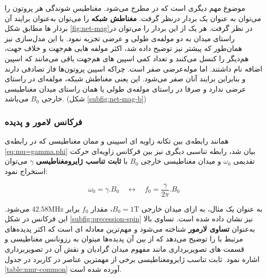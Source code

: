 موضوع مهم دیگری است که در \mri مطرح می‌شود.
مغناطیس شوندگی هر پروتون را می‌توان به عنوان یک بردار در‌نظر گرفت. \textbf{مغناطش شبکه} را می‌توان به‌عنوان برایند آن بردار ها مطابق شکل \ref{fig:net-mag}در نظر گرفت. 
هر یک از این بردار را می‌توان در راستای میدان به دو مولفه‌ی طولی و عرضی تجزیه نمود. با این مدل‌سازی نیز همان‌طور که پیشتر نیز توضیح داده شد، اکثر مولفه هایی هم‌جهت و خلاف جهت، هم‌دیگر را کنسل می‌کنند و تعداد کمی اسپین های هم‌جهت باقی می‌مانند که اسپین اضافه نام داشتند. اما موله‌عرضی صفر است. چراکه اسپین پروتون‌ها فاز تصادفی دارند و بنابراین برایند آنان صفر می‌شود. این یعنی مغناطش شبکه، مولفه‌ای در راستای عرضی ندارد و صرفا در راستای مولفه‌ی طولی یا همان راستای میدان مغناطیسی خارجی $B_0$ می‌باشد. (شکل \ref{subfig:net-mag-b})

\subsubsection{ فرکانس لامور و پدیده \nmr}

همانند رابطه‌ی بین تکانه زاویه ای اسپینی و ممان مغناطیسی که در رابطه‌ی \ref{eq:mu=gamma.phi} بیان شد، رابطه تناسبی دیگری نیز بین فرکانس زاویه‌ای حرکت تقدیمی $\omega_0$ و میدان مغناطیسی خارجی $B_0$  
با \textbf{ثابت تناسب ژایرومغناطیسی}
$\gamma$
می‌توان استخراج نمود:


\removevspace
\begin{equation}\label{eq:larmor}
	\omega_0 = \gamma . B_0 \quad \leftrightarrow \quad f_0 = \frac{\gamma}{2\pi}. B_0
\end{equation}

به عنوان یک مثال، به ازای میدان خارجی $B_0=1 \mathrm{T}$، مقدار $f_0$ برابر $42.58 \mathrm{MHz}$ می‌شود. این فرکانس در شکل \ref{subfig:precession-spin}
نیز نشان داده شده است.
تساوی بالا به‌عنوان \textbf{تساوی لارمور}
شناخته می‌شود و مهم‌ترین معادله ای است که اکثر پدیده‌های مرتبط با \mri را توضیح می‌دهد که از بین آن پدیده‌ها میتوان به رزونانس مغناطیسی و قسمت های تصویر‌برداری مانند مفهوم میدان گرادیان و نقش آن در تصویر‌برداری اشاره نمود. ثابت تناسب ژایرومغناطیسی برخی از مهمترین عناصر در کاربرد \mri در جدول \ref{table:nmr-common} آورده شده است.


